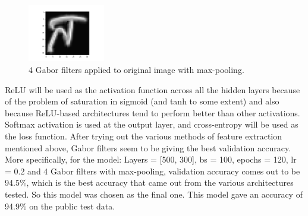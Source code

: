 \documentclass[a4paper]{article}
\begin{document}
\begin{figure} [h!]
\centering
\includegraphics[width=0.3\textwidth]{gabor-main.png}
\caption{\label{fig:gabor}4 Gabor filters applied to original image with max-pooling.}
\end{figure}
\noindent ReLU will be used as the activation function across all the hidden layers because of the problem of saturation in sigmoid (and tanh to some extent) and also because ReLU-based architectures tend to perform better than other activations.
\newline
Softmax activation is used at the output layer, and cross-entropy will be used as the loss function.
\newline
\newline
After trying out the various methods of feature extraction mentioned above, Gabor filters seem to be giving the best validation accuracy. More specifically, for the model: Layers = [500, 300], bs = 100, epochs = 120, lr = 0.2 and 4 Gabor filters with max-pooling, validation accuracy comes out to be 94.5\%, which is the best accuracy that came out from the various architectures tested. So this model was chosen as the final one.
\newline
\newline
This model gave an accuracy of 94.9\% on the public test data.


\end{document}
